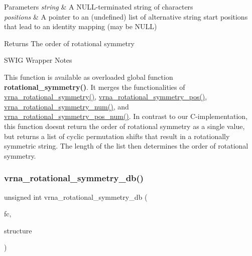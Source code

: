 \begin{DoxyParams}{Parameters}
{\em string} & A N\+U\+L\+L-\/terminated string of characters \\
\hline
{\em positions} & A pointer to an (undefined) list of alternative string start positions that lead to an identity mapping (may be N\+U\+LL) \\
\hline
\end{DoxyParams}
\begin{DoxyReturn}{Returns}
The order of rotational symmetry
\end{DoxyReturn}
\begin{DoxyRefDesc}{S\+W\+I\+G Wrapper Notes}
\item[\mbox{\hyperlink{wrappers__wrappers000019}{S\+W\+I\+G Wrapper Notes}}]This function is available as overloaded global function {\bfseries{rotational\+\_\+symmetry()}}. It merges the functionalities of \mbox{\hyperlink{group__combinatorics__utils_gae1dec02c4b63f303ce06a9293d316762}{vrna\+\_\+rotational\+\_\+symmetry()}}, \mbox{\hyperlink{group__combinatorics__utils_ga294d48935fcac87ab335d771fe289ecb}{vrna\+\_\+rotational\+\_\+symmetry\+\_\+pos()}}, \mbox{\hyperlink{group__combinatorics__utils_gac51464b5281833a58c25f9447252c495}{vrna\+\_\+rotational\+\_\+symmetry\+\_\+num()}}, and \mbox{\hyperlink{group__combinatorics__utils_ga95b5a6ac35da982e2a766f8d2f98a2e1}{vrna\+\_\+rotational\+\_\+symmetry\+\_\+pos\+\_\+num()}}. In contrast to our C-\/implementation, this function doesn\textquotesingle{}t return the order of rotational symmetry as a single value, but returns a list of cyclic permutation shifts that result in a rotationally symmetric string. The length of the list then determines the order of rotational symmetry. \end{DoxyRefDesc}
\mbox{\label{group__combinatorics__utils_gad42ffd53025bed9d636d811748db7c5a}} 
\subsubsection{\texorpdfstring{vrna\_rotational\_symmetry\_db()}{vrna\_rotational\_symmetry\_db()}}
{\footnotesize\ttfamily unsigned int vrna\+\_\+rotational\+\_\+symmetry\+\_\+db (\begin{DoxyParamCaption}\item[{\mbox{\hyperlink{group__fold__compound_ga1b0cef17fd40466cef5968eaeeff6166}{vrna\+\_\+fold\+\_\+compound\+\_\+t}} $\ast$}]{fc,  }\item[{const char $\ast$}]{structure }\end{DoxyParamCaption})}




